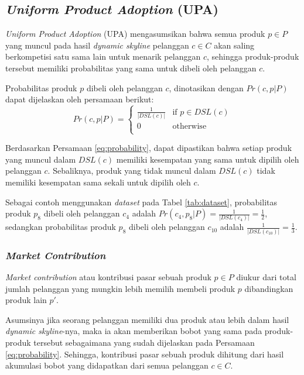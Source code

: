 \subsection{\textit{Uniform Product Adoption} (UPA)}
\tab \textit{Uniform Product Adoption} (UPA) mengasumsikan bahwa semua produk $p \in P$ yang muncul pada hasil \textit{dynamic skyline} pelanggan $c \in C$ akan saling berkompetisi satu sama lain untuk menarik pelanggan $c$, sehingga produk-produk tersebut memiliki probabilitas yang sama untuk dibeli oleh pelanggan $c$.

Probabilitas produk $p$ dibeli oleh pelanggan $c$, dinotasikan dengan $Pr(c, p|P)$ dapat dijelaskan oleh persamaan berikut:
\begin{equation}\label{eq:probability}
Pr(c, p|P) = \left\{
				\begin{array}{ll}
					\frac{1}{|DSL(c)|} & \text{if } p \in DSL(c)\\
					0 & \text{otherwise}\\
				\end{array}
				\right.
\end{equation}

Berdasarkan Persamaan \ref{eq:probability}, dapat dipastikan bahwa setiap produk yang muncul dalam $DSL(c)$ memiliki kesempatan yang sama untuk dipilih oleh pelanggan $c$. Sebaliknya, produk yang tidak muncul dalam $DSL(c)$ tidak memiliki kesempatan sama sekali untuk dipilih oleh $c$.

Sebagai contoh menggunakan \textit{dataset} pada Tabel \ref{tab:dataset}, probabilitas produk $p_8$ dibeli oleh pelanggan $c_4$ adalah $Pr(c_4, p_8|P) = \frac{1}{|DSL(c_4)|} = \frac{1}{2}$, sedangkan probabilitas produk $p_8$ dibeli oleh pelanggan $c_{10}$ adalah $\frac{1}{|DSL(c_{10})|} = \frac{1}{3}$.

\subsubsection{\textit{Market Contribution}}
\tab \textit{Market contribution} atau kontribusi pasar sebuah produk $p \in P$ diukur dari total jumlah pelanggan yang mungkin lebih memilih membeli produk $p$ dibandingkan produk lain $p'$.

Asumsinya jika seorang pelanggan memiliki dua produk atau lebih dalam hasil \textit{dynamic skyline}-nya, maka ia akan memberikan bobot yang sama pada produk-produk tersebut sebagaimana yang sudah dijelaskan pada Persamaan \ref{eq:probability}. Sehingga, kontribusi pasar sebuah produk dihitung dari hasil akumulasi bobot yang didapatkan dari semua pelanggan $c \in C$.

